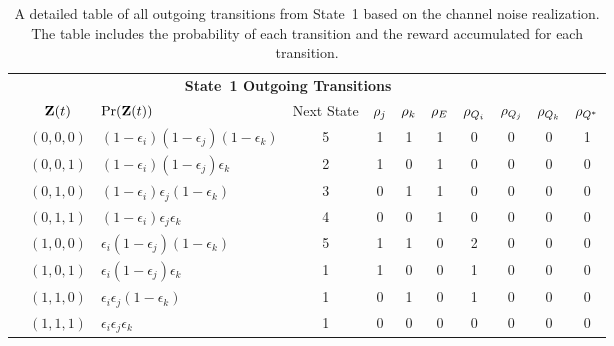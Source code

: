
\setcounter{mymagicrownumbers}{0} 

\begin{table}
	\begin{center}
		\begin{tabular}{c c l *{8}{c}}
			\multicolumn{10}{c}{{\bf State~1 Outgoing Transitions}} \\		
			& $\mathbf{Z}(t)$              & $\operatorname{Pr}(\mathbf{Z}(t))$ & Next State & $\rho_{j}$ & $\rho_{k}$ & $\rho_{E}$ & $\rho_{Q_{i}}$ & $\rho_{Q_{j}}$ & $\rho_{Q_{k}}$ & $\rho_{Q^{*}}$\\
			\hline
			\myrownumber & $(0, 0, 0)$ & $(1 -\epsilon_i)(1 -\epsilon_j)(1 - \epsilon_k)$ & 5 &1 & 1 & 1 & 0 & 0 & 0 & 1 \\
			\myrownumber & $(0, 0, 1)$ & $(1 -\epsilon_i)(1 -\epsilon_j)\epsilon_k$ & 2 &1 & 0 & 1 & 0 & 0 & 0 & 0 \\
			\myrownumber & $(0, 1, 0)$ & $(1 -\epsilon_i)\epsilon_j(1 - \epsilon_k)$ & 3 & 0 & 1 & 1 & 0 & 0 & 0 & 0 \\
			\myrownumber & $(0, 1, 1)$ & $(1 -\epsilon_i)\epsilon_j\epsilon_k$ & 4 & 0 & 0 & 1 & 0 & 0 & 0 & 0 \\
			\myrownumber & $(1, 0, 0)$ & $\epsilon_i(1 -\epsilon_j)(1 - \epsilon_k)$ & 5 & 1 & 1 & 0 & 2 & 0 & 0 & 0 \\
			\myrownumber & $(1, 0, 1)$ & $\epsilon_i(1 -\epsilon_j)\epsilon_k$ & 1 &1 & 0 & 0 & 1 & 0 & 0 & 0 \\											\myrownumber & $(1, 1, 0)$ & $\epsilon_i\epsilon_j(1 - \epsilon_k)$ & 1 &0 & 1 & 0 & 1 & 0 & 0 & 0 \\
			\myrownumber & $(1, 1, 1)$ & $\epsilon_i\epsilon_j\epsilon_k$ & 1 &0 & 0 & 0 & 0 & 0 & 0 & 0 \\
		\end{tabular}
	\end{center}
	\caption{A detailed table of all outgoing transitions from State~1 based on the channel noise realization.  The table includes the probability of each transition and the reward accumulated for each transition.}	
	\label{tab:state1_transitions_all}
\end{table}

\setcounter{mymagicrownumbers}{0} 